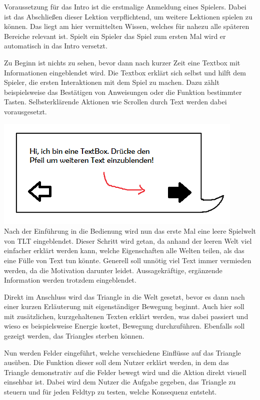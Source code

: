 Voraussetzung für das Intro ist die erstmalige Anmeldung eines Spielers. Dabei ist das Abschließen dieser Lektion verpflichtend, um weitere Lektionen spielen zu können. Das liegt am hier vermittelten Wissen, welches für nahezu alle späteren Bereiche relevant ist. Spielt ein Spieler das Spiel zum ersten Mal wird er automatisch in das Intro versetzt.

Zu Beginn ist nichts zu sehen, bevor dann nach kurzer Zeit eine Textbox mit Informationen eingeblendet wird. Die Textbox erklärt sich selbst und hilft dem Spieler, die ersten Interaktionen mit dem Spiel zu machen. Dazu zählt beispielsweise das Bestätigen von Anweisungen oder die Funktion bestimmter Tasten. Selbsterklärende Aktionen wie Scrollen durch Text werden dabei vorausgesetzt.  \newline  \newline

\includegraphics[scale=1.1]{bilder/Textbox.png}\\[5ex]

Nach der Einführung in die Bedienung wird nun das erste Mal eine leere Spielwelt von TLT eingeblendet. Dieser Schritt wird getan, da anhand der leeren Welt viel einfacher erklärt werden kann, welche Eigenschaften alle Welten teilen, als das eine Fülle von Text tun könnte. Generell soll unnötig viel Text immer vermieden werden, da die Motivation darunter leidet. Aussagekräftige, ergänzende Information werden trotzdem eingeblendet.

Direkt im Anschluss wird das Triangle in die Welt gesetzt, bevor es dann nach einer kurzen Erläuterung mit eigenständiger Bewegung beginnt. Auch hier soll mit zusätzlichen, kurzgehaltenen Texten erklärt werden, was dabei passiert und wieso es beispielsweise Energie kostet, Bewegung durchzuführen. Ebenfalls soll gezeigt werden, das Triangles sterben können.

Nun werden Felder eingeführt, welche verschiedene Einflüsse auf das Triangle ausüben. Die Funktion dieser soll dem Nutzer erklärt werden, in dem das Triangle demonstrativ auf die Felder bewegt wird und die Aktion direkt visuell einsehbar ist. Dabei wird dem Nutzer die Aufgabe gegeben, das Triangle zu steuern und für jeden Feldtyp zu testen, welche Konsequenz entsteht.

